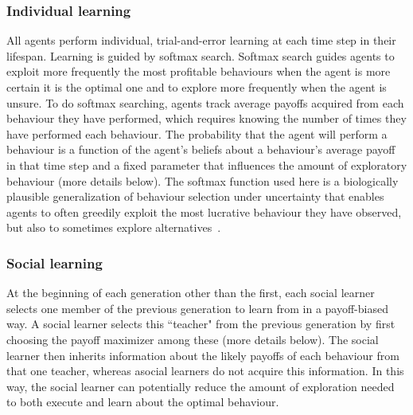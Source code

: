 \documentclass[letterpaper,11.5pt]{scrartcl}
\begin{document}
\subsubsection{Individual learning}

All agents perform individual, trial-and-error learning at each time step in
their lifespan.  Learning is guided by softmax search. Softmax search
guides agents to exploit more frequently the most profitable behaviours when the
agent is more certain it is the optimal one and to explore more frequently when the
agent is unsure. To do softmax searching, agents track average payoffs acquired
from each behaviour they have performed, which requires knowing the number of times they have performed each behaviour. The probability that the agent will perform a behaviour is a function of the agent's beliefs about a behaviour's average payoff in that time step and a fixed parameter that influences the amount of exploratory behaviour (more details below). The softmax function used here is a biologically plausible generalization of behaviour selection under uncertainty that enables agents to often greedily exploit the most lucrative behaviour they have observed, but also to sometimes explore alternatives~\citep{Schulz2019,Collins2013,Daw2006,Yechiam2005}.


\subsubsection{Social learning}

At the beginning of each generation other than the first, each social learner selects
one member of the previous generation to learn from in a payoff-biased way. 
A social learner selects this ``teacher" from the previous generation by first
choosing the payoff maximizer among these (more details below).  The social learner then inherits information about the likely payoffs of each behaviour from that one teacher, whereas asocial learners do not acquire this information. In this way, the social learner can potentially reduce the amount of exploration needed to both execute and learn about the optimal behaviour.  


\end{document}

